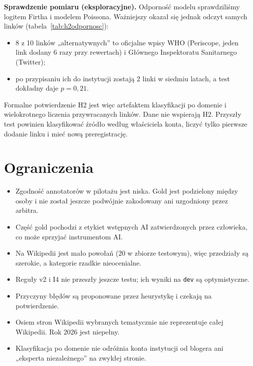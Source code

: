 \documentclass[11pt,a4paper]{article}
\newcommand{\kod}[1]{\texttt{#1}}
\newcommand{\tabela}[1]{{\small}}
\newcommand{\szeroka}[1]{\resizebox{\linewidth}{!}{}}
\begin{document}
\textbf{Sprawdzenie pomiaru (eksploracyjne).} Odporność modelu sprawdziliśmy logitem Firtha \cite{firth1993} i modelem Poissona. Ważniejszy okazał się jednak odczyt samych linków (tabela~\ref{tab:h2odpornosc}):
\begin{itemize}
  \item 8 z 10 linków „alternatywnych” to oficjalne wpisy WHO (Periscope, jeden link dodany 6 razy przy rewertach) i Głównego Inspektoratu Sanitarnego (Twitter);
  \item po przypisaniu ich do instytucji zostają 2 linki w siedmiu latach, a test dokładny daje $p = 0{,}21$.
\end{itemize}
Formalne potwierdzenie H2 jest więc artefaktem klasyfikacji po domenie i wielokrotnego liczenia przywracanych linków. Dane nie wspierają H2. Przyszły test powinien klasyfikować źródło według właściciela konta, liczyć tylko pierwsze dodanie linku i mieć nową preregistrację.

\begin{table}[htbp]
\centering
\caption{H2: test z preregistracji i analizy wrażliwości (iloraz szans na rok, efekty stałe strony).}
\label{tab:h2}
\tabela{h2}
\end{table}

\begin{table}[htbp]
\centering
\caption{H2: analizy odporności i sprawdzenie pomiaru (eksploracyjne, spoza preregistracji).}
\label{tab:h2odpornosc}
\szeroka{h2_robustness}
\end{table}

\section{Ograniczenia}

\begin{itemize}
  \item Zgodność annotatorów w pilotażu jest niska. Gold jest podzielony między osoby i nie został jeszcze podwójnie zakodowany ani uzgodniony przez arbitra.
  \item Część gold pochodzi z etykiet wstępnych AI zatwierdzonych przez człowieka, co może sprzyjać instrumentom AI.
  \item Na Wikipedii jest mało powołań (20 w zbiorze testowym), więc przedziały są szerokie, a kategorie rzadkie nieocenialne.
  \item Reguły v2 i I4 nie przeszły jeszcze testu; ich wyniki na \kod{dev} są optymistyczne.
  \item Przyczyny błędów są proponowane przez heurystykę i czekają na potwierdzenie.
  \item Osiem stron Wikipedii wybranych tematycznie nie reprezentuje całej Wikipedii. Rok 2026 jest niepełny.
  \item Klasyfikacja po domenie nie odróżnia konta instytucji od blogera ani „eksperta niezależnego” na zwykłej stronie.
\end{itemize}
\end{document}
